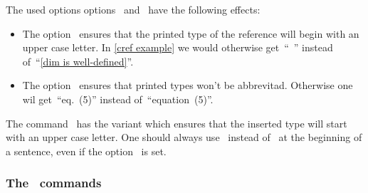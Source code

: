 The used options options~ and~ have the following effects:
\begin{itemize}
  \item
    The option~ ensures that the printed type of the reference will begin with an upper case letter.
    In \cref{cref example} we would otherwise get~\enquote{~} instead of~\enquote{\cref{dim is well-defined}}.
  \item
    The option~ ensures that printed types won’t be abbrevitad.
    Otherwise one wil get~\enquote{eq.\ (5)} instead of~\enquote{equation~(5)}.
\end{itemize}

The command~ has the variant  which ensures that the inserted type will start with an upper case letter.
One should always use~ instead of~ at the beginning of a sentence, even if the option~ is set.

\subsubsection{The~ commands}

